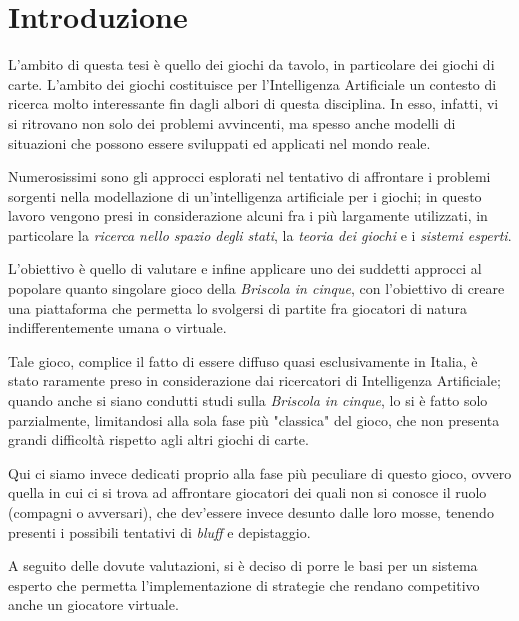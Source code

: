 \chapter*{Introduzione}

\ifpdf
    \graphicspath{{Introduction/IntroductionFigs/PNG/}{Introduction/IntroductionFigs/PDF/}{Introduction/IntroductionFigs/}}
\else
    \graphicspath{{Introduction/IntroductionFigs/EPS/}{Introduction/IntroductionFigs/}}
\fi

L'ambito di questa tesi è quello dei giochi da tavolo, in particolare dei giochi di carte.
L'ambito dei giochi costituisce per l'Intelligenza Artificiale un contesto di ricerca molto interessante fin dagli albori di questa disciplina.
In esso, infatti, vi si ritrovano non solo dei problemi avvincenti, ma spesso anche modelli di situazioni che possono essere sviluppati ed applicati nel mondo reale.


Numerosissimi sono gli approcci esplorati nel tentativo di affrontare i problemi sorgenti nella modellazione di un'intelligenza artificiale per i giochi; in questo lavoro vengono presi in considerazione alcuni fra i più largamente utilizzati, in particolare la \emph{ricerca nello spazio degli stati}, la \emph{teoria dei giochi} e i \emph{sistemi esperti}.

L'obiettivo è quello di valutare e infine applicare uno dei suddetti approcci al popolare quanto singolare gioco della \emph{Briscola in cinque}, con l'obiettivo di creare una piattaforma che permetta lo svolgersi di partite fra giocatori di natura indifferentemente umana o virtuale.

Tale gioco, complice il fatto di essere diffuso quasi esclusivamente in Italia, è stato raramente preso in considerazione dai ricercatori di Intelligenza Artificiale; quando anche si siano condutti studi sulla \emph{Briscola in cinque}, lo si è fatto solo parzialmente, limitandosi alla sola fase più "classica" del gioco, che non presenta grandi difficoltà rispetto agli altri giochi di carte.

Qui ci siamo invece dedicati proprio alla fase più peculiare di questo gioco, ovvero quella in cui ci si trova ad affrontare giocatori dei quali non si conosce il ruolo (compagni o avversari), che dev'essere invece desunto dalle loro mosse, tenendo presenti i possibili tentativi di \emph{bluff} e depistaggio.

A seguito delle dovute valutazioni, si è deciso di porre le basi per un sistema esperto che permetta l'implementazione di strategie che rendano competitivo anche un giocatore virtuale.






